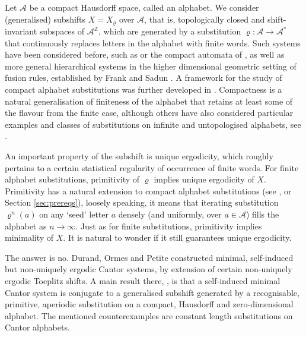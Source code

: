 \documentclass[11pt]{amsart}
\numberwithin{equation}{section}
\theoremstyle{plain}
\theoremstyle{definition}
\newcommand{\Z}{{\mathbb Z}}
\newcommand{\mc}{\mathcal}
\newcommand{\A}{\mc A}
\newcommand{\sub}{\varrho}
\begin{document}
Let \(\A\) be a compact Hausdorff space, called an alphabet. We consider (generalised) subshifts \(X = X_{\sub}\) over \(\A\), that is, topologically closed and shift-invariant subspaces of \(\A^\Z\), which are generated by a substitution \(\sub \colon \A \to \A^\ast\) that continuously replaces letters in the alphabet with finite words. Such systems have been considered before, such as \cite{DOP18} or the compact automata of \cite[Chapter 12]{Que10}, as well as more general hierarchical systems in the higher dimensional geometric setting of fusion rules, established by Frank and Sadun \cite{FS14}. A framework for the study of compact alphabet substitutions was further developed in \cite{MRW25}. Compactness is a natural generalisation of finiteness of the alphabet that retains at least some of the flavour from the finite case, although others have also considered particular examples and classes of substitutions on infinite and untopologised alphabets, see \cite{Fer06,BJPS24}.

An important property of the subshift is unique ergodicity, which roughly pertains to a certain statistical regularity of occurrence of finite words. For finite alphabet substitutions, primitivity of \(\sub\) implies unique ergodicity of \(X\). Primitivity has a natural extension to compact alphabet substitutions (see \cite{DOP18}, \cite{MRW25} or Section \ref{sec:prereqs}), loosely speaking, it means that iterating substitution \(\sub^n(a)\) on any `seed' letter \(a\) densely (and uniformly, over \(a \in \A\)) fills the alphabet as \(n \to \infty\). Just as for finite substitutions, primitivity implies minimality of \(X\). It is natural to wonder if it still guarantees unique ergodicity.

The answer is no. Durand, Ormes and Petite \cite{DOP18} constructed minimal, self-induced but non-uniquely ergodic Cantor systems, by extension of certain non-uniquely ergodic Toeplitz shifts. A main result there, \cite[Theorem 25]{DOP18}, is that a self-induced minimal Cantor system is conjugate to a generalised subshift generated by a recognisable, primitive, aperiodic substitution on a compact, Hausdorff and zero-dimensional alphabet. The mentioned counterexamples are constant length substitutions on Cantor alphabets.
\end{document}
